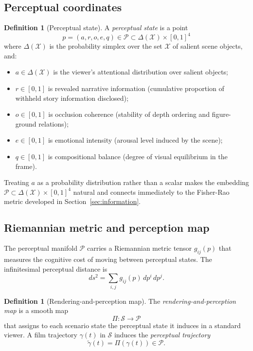 \documentclass[12pt,a4paper]{article}
\theoremstyle{plain}
\theoremstyle{definition}
\newtheorem{definition}[theorem]{Definition}
\begin{document}
\subsection{Perceptual coordinates}

\begin{definition}[Perceptual state]
A \emph{perceptual state} is a point
\[
p = (a, r, o, e, q)
\in \mathcal{P} \subset \Delta(\mathcal{X}) \times [0,1]^4
\]
where $\Delta(\mathcal{X})$ is the probability simplex over the set
$\mathcal{X}$ of salient scene objects, and:
\begin{itemize}[nosep]
\item $a \in \Delta(\mathcal{X})$ is the viewer's attentional distribution
  over salient objects;
\item $r \in [0,1]$ is revealed narrative information (cumulative proportion
  of withheld story information disclosed);
\item $o \in [0,1]$ is occlusion coherence (stability of depth ordering and
  figure-ground relations);
\item $e \in [0,1]$ is emotional intensity (arousal level induced by the scene);
\item $q \in [0,1]$ is compositional balance (degree of visual equilibrium
  in the frame).
\end{itemize}
\end{definition}

Treating $a$ as a probability distribution rather than a scalar makes the
embedding $\mathcal{P}\subset\Delta(\mathcal{X})\times[0,1]^4$ natural and
connects immediately to the Fisher-Rao metric developed in
Section~\ref{sec:information}.

\subsection{Riemannian metric and perception map}

The perceptual manifold $\mathcal{P}$ carries a Riemannian metric tensor
$g_{ij}(p)$ that measures the cognitive cost of moving between perceptual
states. The infinitesimal perceptual distance is
\[
ds^2 = \sum_{i,j} g_{ij}(p)\,dp^i\,dp^j.
\]

\begin{definition}[Rendering-and-perception map]
The \emph{rendering-and-perception map} is a smooth map
\[
\Pi: \mathcal{S} \to \mathcal{P}
\]
that assigns to each scenario state the perceptual state it induces in a
standard viewer. A film trajectory $\gamma(t)$ in $\mathcal{S}$ induces the
\emph{perceptual trajectory}
\[
\tilde\gamma(t) = \Pi(\gamma(t)) \in \mathcal{P}.
\]
\end{definition}
\end{document}
